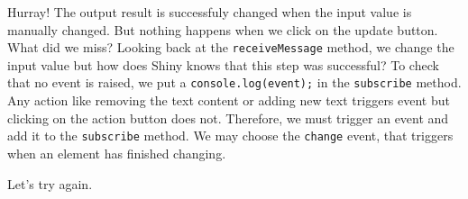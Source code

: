 \documentclass[]{book}
\newenvironment{Shaded}{\begin{snugshade}}{\end{snugshade}}
\newcommand{\AttributeTok}[1]{\textcolor[rgb]{0.77,0.63,0.00}{#1}}
\newcommand{\KeywordTok}[1]{\textcolor[rgb]{0.13,0.29,0.53}{\textbf{#1}}}
\newcommand{\NormalTok}[1]{#1}
\newcommand{\OperatorTok}[1]{\textcolor[rgb]{0.81,0.36,0.00}{\textbf{#1}}}
\newcommand{\StringTok}[1]{\textcolor[rgb]{0.31,0.60,0.02}{#1}}
\begin{document}
Hurray! The output result is successfuly changed when the input value is manually changed. But nothing happens when we click on the update button. What did we miss? Looking back at the \texttt{receiveMessage} method, we change the input value but how does Shiny knows that this step was successful? To check that no event is raised, we put a \texttt{console.log(event);} in the \texttt{subscribe} method. Any action like removing the text content or adding new text triggers event but clicking on the action button does not. Therefore, we must trigger an event and add it to the \texttt{subscribe} method. We may choose the \texttt{change} event, that triggers when an element has finished changing.

\begin{Shaded}
\end{Shaded}

Let's try again.
\end{document}
